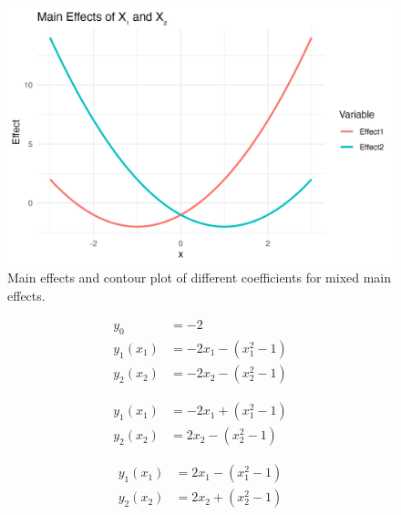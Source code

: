 \begin{figure}[htpb]
\begin{minipage}[t]{0.49\textwidth}
    \end{minipage}
    \hfill
    \begin{minipage}[t]{0.49\textwidth}
        \centering
        \includegraphics[width=\textwidth]{images/mixed_a1p20_a2m20_a11p10_a22p10_a12p00_rhop00_main.png}
    \end{minipage}
    \caption{Main effects and contour plot of different coefficients for mixed main effects.}
    \label{fig:mixed_rho_0}
\end{figure}
\begin{align*}
y_0 &= -2 \\[3pt]
y_1(x_1) &= -2x_1 - (x_1^2 - 1) \\[3pt]
y_2(x_2) &= -2x_2 - (x_2^2 - 1)
\end{align*}

\begin{align*}
y_1(x_1) &= -2x_1 + (x_1^2 - 1) \\[3pt]
y_2(x_2) &= 2x_2 - (x_2^2 - 1)
\end{align*}

\begin{align*}
y_1(x_1) &= 2x_1 - (x_1^2 - 1) \\[3pt]
y_2(x_2) &= 2x_2 + (x_2^2 - 1)
\end{align*}


